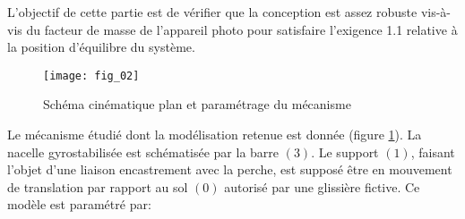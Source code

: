 \begin{obj}
 L'objectif de cette partie est de vérifier que la conception est assez robuste vis-à-vis du facteur de masse de l'appareil photo pour satisfaire l'exigence 1.1 relative à la position d'équilibre du système.
\end{obj}

\begin{figure}[!h]
\centering
\texttt{[image: fig\_02]}
\caption{Schéma cinématique plan et paramétrage du mécanisme}
\label{Cy_11_Ch_03_PFS_2D_TD_05_fig_02}
\end{figure}



Le mécanisme étudié dont la modélisation retenue est donnée (figure \ref{Cy_11_Ch_03_PFS_2D_TD_05_fig_02}). La nacelle gyrostabilisée est schématisée par la barre $(3)$. Le support $(1)$, faisant l'objet d'une liaison encastrement avec la perche, est supposé être en mouvement de translation par rapport au sol $(0)$ autorisé par une glissière fictive. Ce modèle est paramétré par:


